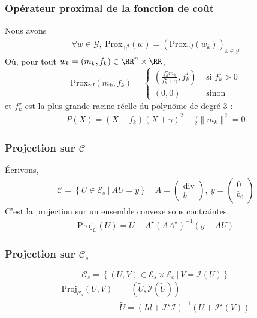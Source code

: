 \documentclass{beamer}
\newcommand{\prox}{\text{Prox}}
\renewcommand{\div}{\text{div}}
\newcommand{\proj}{\text{Proj}}
\begin{document}
\begin{frame}\frametitle{Opérateur proximal de la fonction de coût}
\begin{proposition}
\label{prop:proxJ}
Nous avons
\begin{align*}
\forall w\in\mathcal{G},\ \prox_{\gamma \mathcal{J}}(w) = \left( \prox_{\gamma J}(w_k)\right)_{k\in\mathcal{G}}
\end{align*}
Où, pour tout $w_k=(m_k,f_k)\in\RR^n\times\RR$, 
$$
\prox_{\gamma J}(m_k,f_k) =\left\{
\begin{array}{cl}
\left(\frac{f^{\star}_k m_k}{f^{\star}_k+\gamma} ,f^{\star}_k\right) & \text{ si } f^{\star}_k >0\\
(0,0) & \text{ sinon }
\end{array}\right.
$$
et $f^{\star}_k$ est la plus grande racine réelle du polynôme de degré 3 : 
\begin{align}
P(X) = (X-f_k)(X+\gamma)^2 -\frac{\gamma}{2}\|m_k\|^2=0
\end{align}
\end{proposition}
\end{frame}	  

\begin{frame}\frametitle{Projection sur $\mathcal{C}$}
Écrivons,
\begin{align*}
\mathcal{C}=\left\{U\in\mathcal{E}_s\ |\ AU=y\right\} \quad A=\begin{pmatrix}
\div \\
b
\end{pmatrix},\ y=\begin{pmatrix}
0 \\
b_0
\end{pmatrix}
\end{align*}
C'est la projection sur un ensemble convexe sous contraintes. 
\begin{align*}
\proj_{\mathcal{C}}(U) = U - A^{\star} (AA^{\star})^{-1}(y-AU)
\end{align*}
\end{frame}
  
\begin{frame}\frametitle{Projection sur $\mathcal{C}_s$}
$$
\mathcal{C}_s=\left\{(U,V)\in\mathcal{E}_s\times\mathcal{E}_c\ |\ V=\mathcal{I}(U)\right\}
$$
\begin{align*}
\proj_{\mathcal{C}_s}(U,V) &= (\tilde{U},\mathcal{I}(\tilde{U}))\\
&\tilde{U}= (Id+\mathcal{I}^{\star}\mathcal{I})^{-1}(U+\mathcal{I}^{\star}(V))
\end{align*}
\end{frame}
\end{document}
